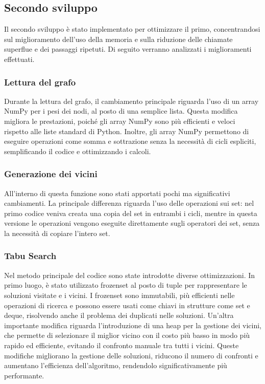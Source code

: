 \documentclass[12pt,a4paper,twoside]{article}
\begin{document}
\subsection{Secondo sviluppo}
Il secondo sviluppo è stato implementato per ottimizzare il primo, concentrandosi sul miglioramento dell'uso della memoria e sulla riduzione delle chiamate superflue e dei passaggi ripetuti. Di seguito verranno analizzati i miglioramenti effettuati.
\subsubsection{Lettura del grafo}
Durante la lettura del grafo, il cambiamento principale riguarda l'uso di un array NumPy per i pesi dei nodi, al posto di una semplice lista. Questa modifica migliora le prestazioni, poiché gli array NumPy sono più efficienti e veloci rispetto alle liste standard di Python. Inoltre, gli array NumPy permettono di eseguire operazioni come somma e sottrazione senza la necessità di cicli espliciti, semplificando il codice e ottimizzando i calcoli.
\subsubsection{Generazione dei vicini}
All'interno di questa funzione sono stati apportati pochi ma significativi cambiamenti. La principale differenza riguarda l'uso delle operazioni sui set: nel primo codice veniva creata una copia del set in entrambi i cicli, mentre in questa versione le operazioni vengono eseguite direttamente sugli operatori dei set, senza la necessità di copiare l'intero set.\clearpage
\subsubsection{Tabu Search}
Nel metodo principale del codice sono state introdotte diverse ottimizzazioni. In primo luogo, è stato utilizzato frozenset al posto di tuple per rappresentare le soluzioni visitate e i vicini. I frozenset sono immutabili, più efficienti nelle operazioni di ricerca e possono essere usati come chiavi in strutture come set e deque, risolvendo anche il problema dei duplicati nelle soluzioni. Un'altra importante modifica riguarda l'introduzione di una heap per la gestione dei vicini, che permette di selezionare il miglior vicino con il costo più basso in modo più rapido ed efficiente, evitando il confronto manuale tra tutti i vicini. Queste modifiche migliorano la gestione delle soluzioni, riducono il numero di confronti e aumentano l'efficienza dell'algoritmo, rendendolo significativamente più performante.
\end{document}
